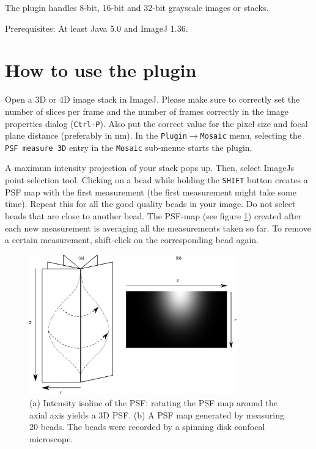 \documentclass{scrartcl}
\begin{document}
The plugin handles 8-bit, 16-bit and 32-bit grayscale images or stacks. 

Prerequisites: At least Java 5.0 and ImageJ 1.36.

\section{How to use the plugin}
Open a 3D or 4D image stack in ImageJ. Please make sure to correctly set the number of slices per frame and the number of frames correctly in the image properties dialog (\texttt{Ctrl-P}). Also put the correct value for the pixel size and focal plane distance (preferably in nm). In the \texttt{Plugin$\rightarrow$Mosaic} menu, selecting the \texttt{PSF measure 3D} entry in the \texttt{Mosaic} sub-menue starts the plugin. 

A maximum intensity projection of your stack pops up. Then, select ImageJs point selection tool. Clicking on a bead while holding the \texttt{SHIFT} button creates a PSF map with the first measurement (the first measurement might take some time). Repeat this for all the good quality beads in your image. Do not select beads that are close to another bead. The PSF-map (see figure \ref{fig:psfmap}) created after each new measurement is averaging all the measurements taken so far. To remove a certain measurement, shift-click on the corresponding bead again.

\begin{figure}[h]
  \centering
  \includegraphics[width=0.8\textwidth]{psfmap} 
  \caption{ (a) Intensity isoline of the PSF: rotating the PSF map around the axial axis yields a 3D PSF. (b) A PSF map generated by measuring 20 beads. The beads were recorded by a spinning disk confocal microscope.
  \label{fig:psfmap}}
\end{figure}
\end{document}

